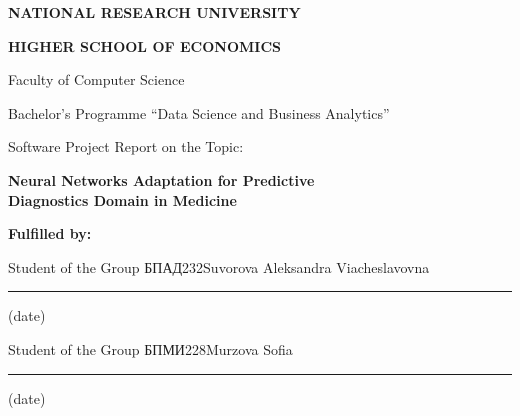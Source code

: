 \begin{titlepage}
\thispagestyle{empty}
\centering

{\Large\bfseries NATIONAL RESEARCH UNIVERSITY\par}
\vspace{0.25cm}
{\Large\bfseries HIGHER SCHOOL OF ECONOMICS\par}

\vspace{1.8cm}

{\large Faculty of Computer Science\par}
\vspace{0.3cm}
{\large Bachelor's Programme ``Data Science and Business Analytics''\par}

\vspace{2.2cm}

{\large Software Project Report on the Topic:\par}
\vspace{0.6cm}
{\LARGE\bfseries Neural Networks Adaptation for Predictive\\
Diagnostics Domain in Medicine\par}

\vspace{2.2cm}

\begin{flushleft}
\hspace{1cm}\textbf{Fulfilled by:}\par
\vspace{0.3cm}
\hspace{1cm}\begin{minipage}{0.92\textwidth}
Student of the Group БПАД232\hfill Suvorova Aleksandra Viacheslavovna\par
\vspace{0.05cm}
\hfill\rule{4cm}{0.3pt}\par
\vspace{-0.15cm}
\hfill (date)\par
\vspace{0.5cm}
Student of the Group БПМИ228\hfill Murzova Sofia\par
\vspace{0.05cm}
\hfill\rule{4cm}{0.3pt}\par
\vspace{-0.15cm}
\hfill (date)\par
\end{minipage}


\end{flushleft}
\end{titlepage}
